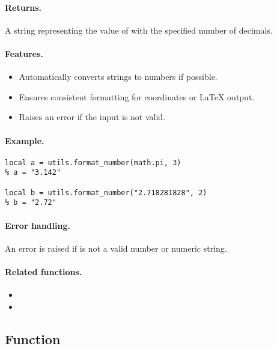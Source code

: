 \paragraph{Returns.}
A string representing the value of  with the specified number of decimals.

\paragraph{Features.}
\begin{itemize}
\item Automatically converts strings to numbers if possible.
\item Ensures consistent formatting for \TIKZ{} coordinates or LaTeX output.
\item Raises an error if the input is not valid.
\end{itemize}

\paragraph{Example.}
\begin{verbatim}
local a = utils.format_number(math.pi, 3)
% a = "3.142"

local b = utils.format_number("2.718281828", 2)
% b = "2.72"
\end{verbatim}

\paragraph{Error handling.}
An error is raised if  is not a valid number or numeric string.

\paragraph{Related functions.}
\begin{itemize}
\item {}
\item {}
\end{itemize}



\subsection{Function } %
\label{sub:function_utils_format_coord}

